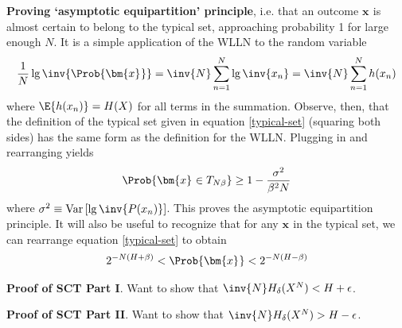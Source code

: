 \documentclass[11pt]{article}
\renewcommand\vec[2][]{\bm{#2}_{#1}}
\newcommand\Var[1]{\mathrm{Var}\left[#1\right]}
\begin{document}
\begin{compactitem}
	\item \textbf{Proving `asymptotic equipartition' principle}, i.e. that an outcome $\vec{x}$ is almost certain to belong to the typical set, approaching probability 1 for large enough $N$. It is a simple application of the WLLN to the random variable
	\begin{align}
		\frac{1}{N} \lg \inv{ \Prob{\vec x} } = \inv{N} \sum_{n = 1}^{N} \lg \inv{x_n} = \inv{N} \sum_{n = 1}^{N} h(x_n)
	\end{align}
	where $\E{h(x_n)} = H(X)$ for all terms in the summation. Observe, then, that the definition of the typical set given in equation \ref{typical-set} (squaring both sides) has the same form as the definition for the WLLN. Plugging in and rearranging yields
	\begin{align}
		\Prob{\vec x \in T_{N\beta}} \ge 1 - \frac{\sigma^2}{\beta^2N}
	\end{align}
	where $\sigma^2 \equiv \Var{\lg\inv{P(x_n)}}$. This proves the asymptotic equipartition principle. It will also be useful to recognize that for any $\vec x$ in the typical set, we can rearrange equation \ref{typical-set} to obtain
	\begin{align}
		2^{-N(H + \beta)} < \Prob{\vec x} < 2^{-N(H - \beta)} \label{ts-range}
	\end{align}
	
	\item \textbf{Proof of SCT Part I}. Want to show that $\inv{N} H_{\delta}(X^N) < H + \epsilon$. 


	\item \textbf{Proof of SCT Part II}. Want to show that $\inv{N} H_{\delta}(X^N) > H - \epsilon$. 	
	
\end{compactitem}
\end{document}
